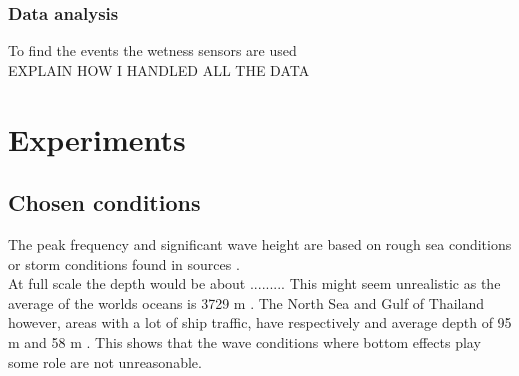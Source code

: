 \subsection{Data analysis}
\label{sec:analyzing_data}
To find the events the wetness sensors are used \\
EXPLAIN HOW I HANDLED ALL THE DATA


\chapter{Experiments}
\label{sec:experiments}

\section{Chosen conditions}
\label{sec:exp_conditions}
The peak frequency and significant wave height are based on rough sea conditions or storm conditions found in sources \cite{Deelen2014, Mazaheri2019, Collins2018, Techet2005}. \\

At full scale the depth would be about ......... This might seem unrealistic as the average of the worlds oceans is 3729 m \cite{Zeecijfers}. The North Sea and Gulf of Thailand however, areas with a lot of ship traffic, have respectively and average depth of 95 m \cite{NorthSeaDepth} and 58 m \cite{Khongchai2003}. This shows that the wave conditions where bottom effects play some role are not unreasonable.
